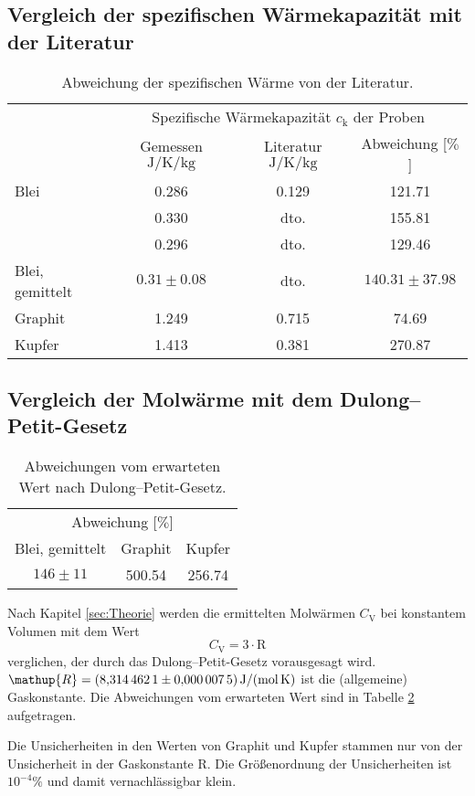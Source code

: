 \subsection{Vergleich der spezifischen Wärmekapazität mit der Literatur}
\begin{table}[htbp]
	\centering
	\begin{tabular}{lccc}
		\toprule
		&\multicolumn{3}{c}{Spezifische Wärmekapazität $c_\text{k}$ der Proben}\\
		&{Gemessen $\si{\joule\per\kelvin\per\kilo\gram}$}  &{Literatur $\si{\joule\per\kelvin\per\kilo\gram}$}& {Abweichung [$\%$]}\\
		\midrule
		{Blei}	&0.286	&0.129	&121.71\\
				&0.330	&dto.	&155.81\\
				&0.296	&dto.	&129.46\\
		{Blei, gemittelt}	&$0.31\pm0.08$	&dto.	&$140.31\pm 37.98$\\
		{Graphit}&1.249 &0.715& 74.69\\
		{Kupfer}&1.413	&0.381	& 270.87\\
		\bottomrule
	\end{tabular}
	\caption{Abweichung der spezifischen Wärme von der Literatur\cite{SpeziWaerme}.}
	\label{tab:compare}
\end{table}
\subsection{Vergleich der Molwärme mit dem Dulong--Petit-Gesetz}
\begin{table}[htbp]
	\centering
	\begin{tabular}{ccc}
		\toprule
		\multicolumn{3}{c}{Abweichung [$\%$]}\\
		{Blei, gemittelt}	&{Graphit}&{Kupfer}\\
		\midrule
		$146\pm11$	&500.54	&256.74\\
		\bottomrule
	\end{tabular}
	\caption{Abweichungen vom erwarteten Wert nach Dulong--Petit-Gesetz.}
	\label{tab:failz}
\end{table}
Nach Kapitel \ref{sec:Theorie} werden die ermittelten Molwärmen $C_\mathup{V}$ bei konstantem Volumen mit dem Wert
\begin{equation}
	C_\mathup{V} = 3\cdot \mathup{R}
\end{equation}
verglichen, der durch das Dulong--Petit-Gesetz vorausgesagt wird.\\
$\mathup{R}= \SI{8.3144621\pm0.0000075}{\joule\per\mol\per\kelvin}$ ist die (allgemeine) Gaskonstante\cite{Gaskonstante}.
Die Abweichungen vom erwarteten Wert sind in Tabelle \ref{tab:failz} aufgetragen. 

Die Unsicherheiten in den Werten von Graphit und Kupfer stammen nur von der Unsicherheit in der Gaskonstante $\mathup{R}$. 
Die Größenordnung der Unsicherheiten ist $10^{-4}\%$ und damit vernachlässigbar klein.


